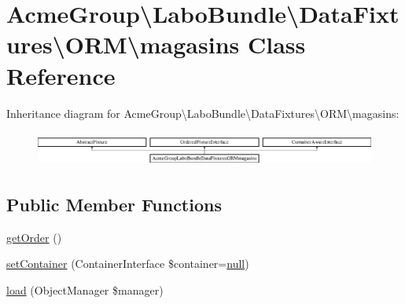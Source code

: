 \hypertarget{class_acme_group_1_1_labo_bundle_1_1_data_fixtures_1_1_o_r_m_1_1magasins}{\section{Acme\+Group\textbackslash{}Labo\+Bundle\textbackslash{}Data\+Fixtures\textbackslash{}O\+R\+M\textbackslash{}magasins Class Reference}
\label{class_acme_group_1_1_labo_bundle_1_1_data_fixtures_1_1_o_r_m_1_1magasins}
}
Inheritance diagram for Acme\+Group\textbackslash{}Labo\+Bundle\textbackslash{}Data\+Fixtures\textbackslash{}O\+R\+M\textbackslash{}magasins\+:\begin{figure}[H]
\begin{center}
\leavevmode
\includegraphics[height=1.159420cm]{class_acme_group_1_1_labo_bundle_1_1_data_fixtures_1_1_o_r_m_1_1magasins}
\end{center}
\end{figure}
\subsection*{Public Member Functions}
\begin{DoxyCompactItemize}
\item 
\hyperlink{class_acme_group_1_1_labo_bundle_1_1_data_fixtures_1_1_o_r_m_1_1magasins_a64af461fd1a9b9d0f1bfc6bff9e79248}{get\+Order} ()
\item 
\hyperlink{class_acme_group_1_1_labo_bundle_1_1_data_fixtures_1_1_o_r_m_1_1magasins_a656a561d36bdedd96d50655c055f80b6}{set\+Container} (Container\+Interface \$container=\hyperlink{validate_8js_afb8e110345c45e74478894341ab6b28e}{null})
\item 
\hyperlink{class_acme_group_1_1_labo_bundle_1_1_data_fixtures_1_1_o_r_m_1_1magasins_a86fa92b163bf3db16a3574c10b2878bd}{load} (Object\+Manager \$manager)
\end{DoxyCompactItemize}


